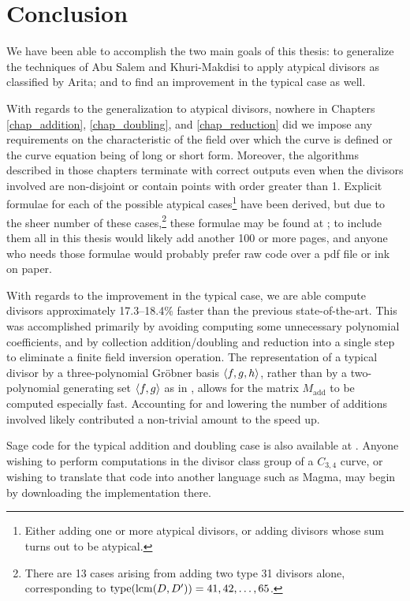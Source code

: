 
\section{Conclusion}
\label{chap_conclusion}

We have been able to accomplish the two main goals of this thesis:
to generalize the techniques of Abu Salem and Khuri-Makdisi to apply atypical divisors as classified by Arita;
and to find an improvement in the typical case as well.

With regards to the generalization to atypical divisors,
nowhere in Chapters \ref{chap_addition}, \ref{chap_doubling}, and \ref{chap_reduction}
did we impose any requirements on the characteristic of the field over which the curve is defined
or the curve equation being of long or short form.
Moreover, the algorithms described in those chapters terminate with correct outputs
even when the divisors involved are non-disjoint or contain points with order greater than 1.
Explicit formulae for each of the possible atypical cases\footnote{
Either adding one or more atypical divisors, or adding divisors whose sum turns out to be atypical.}
have been derived, but due to the sheer number of these cases,\footnote{
There are 13 cases arising from adding two type 31 divisors alone,
corresponding to $\operatorname{type}(\operatorname{lcm}(D, D')) = 41, 42, \ldots, 65$.}
these formulae may be found at \cite{github};
to include them all in this thesis would likely add another 100 or more pages,
and anyone who needs those formulae would probably prefer raw code over a pdf file or ink on paper.

With regards to the improvement in the typical case,
we are able compute divisors approximately 17.3--18.4\% faster than the previous state-of-the-art.
This was accomplished primarily by avoiding computing some unnecessary polynomial coefficients,
and by collection addition/doubling and reduction into a single step to eliminate a finite field inversion operation.
The representation of a typical divisor by a three-polynomial Gr\"obner basis $\left\langle f,g,h \right\rangle$,
rather than by a two-polynomial generating set $\left\langle f,g \right\rangle$ as in \cite{salem07},
allows for the matrix $M_{\text{add}}$ to be computed especially fast.
Accounting for and lowering the number of additions involved likely contributed a non-trivial amount to the speed up.

Sage code for the typical addition and doubling case is also available at \cite{github}.
Anyone wishing to perform computations in the divisor class group of a $C_{3,4}$ curve,
or wishing to translate that code into another language such as Magma,
may begin by downloading the implementation there.




